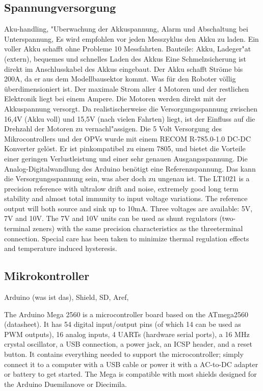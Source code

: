 \documentclass[a4paper,bibtotoc,oneside]{scrbook}
\begin{document}
\subsection{Spannungversorgung}\thispagestyle{empty}
Aku-handling, "Uberwachung der Akkuspannung, Alarm und Abschaltung bei Unterspannung, 
Es wird empfohlen vor jeden Messzyklus den Akku zu laden. Ein voller Akku schafft ohne Probleme 10 Messfahrten. 
Bauteile: Akku, Ladeger"at (extern), bequemes und schnelles Laden des Akkus
Eine Schmelzsicherung ist direkt im Anschlusskabel des Akkus eingebaut. Der Akku schafft Ströme bis 200A, da er aus dem Modellbausektor kommt. Was für den Roboter völlig überdimensioniert ist. Der maximale Strom aller 4 Motoren und der restlichen Elektronik liegt bei einem Ampere. Die Motoren werden direkt mit der Akkuspannung versorgt. Da realistischerweise die Versorgungsspannung zwischen 16,4V (Akku voll) und 15,5V (nach vielen Fahrten) liegt, ist der Einfluss auf die Drehzahl der Motoren zu vernachl"assigen. 
Die 5 Volt Versorgung des Mikrocontrollers und der OPVs wurde mit einem RECOM R-785.0-1.0 DC-DC Konverter gelöst. Er ist pinkompatibel zu einem 7805, und bietet die Vorteile einer geringen Verlustleistung und einer sehr genauen Ausgangsspannung. 
Die Analog-Digitalwandlung des Arduino benötigt eine Referenzspannung. Das kann die Versorgungsspannung sein, was aber doch zu ungenau ist. 
The LT1021 is a precision reference with ultralow drift
and noise, extremely good long term stability and almost
total immunity to input voltage variations. The reference
output will both source and sink up to 10mA. Three
voltages are available: 5V, 7V and 10V. The 7V and 10V
units can be used as shunt regulators (two-terminal zeners)
with the same precision characteristics as the threeterminal
connection. Special care has been taken to minimize
thermal regulation effects and temperature
induced hysteresis.
\subsection{Mikrokontroller}\thispagestyle{empty}
Arduino (was ist das), Shield, SD, Aref,

The Arduino Mega 2560 is a microcontroller board based on the ATmega2560 (datasheet). It has 54 digital input/output pins (of which 14 can be used as PWM outputs), 16 analog inputs, 4 UARTs (hardware serial ports), a 16 MHz crystal oscillator, a USB connection, a power jack, an ICSP header, and a reset button. It contains everything needed to support the microcontroller; simply connect it to a computer with a USB cable or power it with a AC-to-DC adapter or battery to get started. The Mega is compatible with most shields designed for the Arduino Duemilanove or Diecimila.
\end{document}

